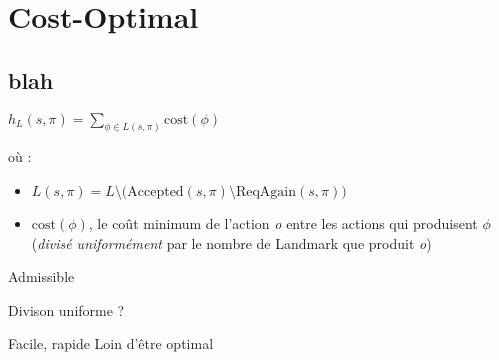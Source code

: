 \section{Cost-Optimal}
  \subsection*{blah}

\begin{frame}
  \begin{block}{}
     
  \end{block}

  \begin{block}{}
      \begin{center}
        $h_L(s, \pi) = \sum_{\phi \in L(s, \pi)} \text{cost}(\phi)$
      \end{center}
      
      où :
    \begin{itemize}
      \item $L(s, \pi) = L \setminus \big(\text{Accepted}(s, \pi) \setminus \text{ReqAgain}(s, \pi)\big)$
      \item $\text{cost}(\phi)$, le coût minimum de l'action \emph{o} entre les actions qui produisent $\phi$ (\emph{divisé uniformément} par le nombre de Landmark que produit \emph{o})
    \end{itemize}
    \alert{Admissible}
  \end{block}
  
  \begin{block}{Divison uniforme ?}
    \begin{itemize}
      \proitem Facile, rapide
      \conitem Loin d'être optimal
    \end{itemize}
  \end{block}
\end{frame}

\begin{frame}
  
\end{frame}

